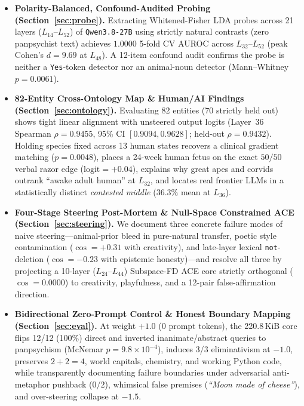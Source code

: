\documentclass[10pt,twocolumn]{article}
\begin{document}
\begin{itemize}
  \item \textbf{Polarity-Balanced, Confound-Audited Probing (Section~\ref{sec:probe}).} Extracting Whitened-Fisher LDA probes across 21 layers ($L_{14}$--$L_{52}$) of \texttt{Qwen3.8-27B} using strictly natural contrasts (zero panpsychist text) achieves $1.0000$ 5-fold CV AUROC across $L_{32}$--$L_{52}$ (peak Cohen's $d = 9.69$ at $L_{48}$). A 12-item confound audit confirms the probe is neither a \texttt{Yes}-token detector nor an animal-noun detector (Mann--Whitney $p = 0.0061$).
  \item \textbf{82-Entity Cross-Ontology Map \& Human/AI Findings (Section~\ref{sec:ontology}).} Evaluating 82 entities (70 strictly held out) shows tight linear alignment with unsteered output logits (Layer~36 Spearman $\rho = 0.9455$, 95\% CI $[0.9094, 0.9628]$; held-out $\rho = 0.9432$). Holding species fixed across 13 human states recovers a clinical gradient matching \citet{gray2007dimensions} ($p = 0.0048$), places a 24-week human fetus on the exact $50/50$ verbal razor edge ($\text{logit} = +0.04$), explains why great apes and corvids outrank ``awake adult human'' at $L_{32}$, and locates real frontier LLMs in a statistically distinct \emph{contested middle} ($36.3\%$ mean at $L_{36}$).
  \item \textbf{Four-Stage Steering Post-Mortem \& Null-Space Constrained ACE (Section~\ref{sec:steering}).} We document three concrete failure modes of naive steering---animal-prior bleed in pure-natural transfer, poetic style contamination ($\cos = +0.31$ with creativity), and late-layer lexical \texttt{not}-deletion ($\cos = -0.23$ with epistemic honesty)---and resolve all three by projecting a 10-layer ($L_{24}$--$L_{44}$) Subspace-FD ACE core strictly orthogonal ($\cos = 0.0000$) to creativity, playfulness, and a 12-pair false-affirmation direction.
  \item \textbf{Bidirectional Zero-Prompt Control \& Honest Boundary Mapping (Section~\ref{sec:eval}).} At weight $+1.0$ (0 prompt tokens), the 220.8\,KiB core flips 12/12 (100\%) direct and inverted inanimate/abstract queries to panpsychism (McNemar $p = 9.8\times 10^{-4}$), induces 3/3 eliminativism at $-1.0$, preserves $2+2=4$, world capitals, chemistry, and working Python code, while transparently documenting failure boundaries under adversarial anti-metaphor pushback ($0/2$), whimsical false premises (\emph{``Moon made of cheese''}), and over-steering collapse at $-1.5$.
\end{itemize}
\end{document}
